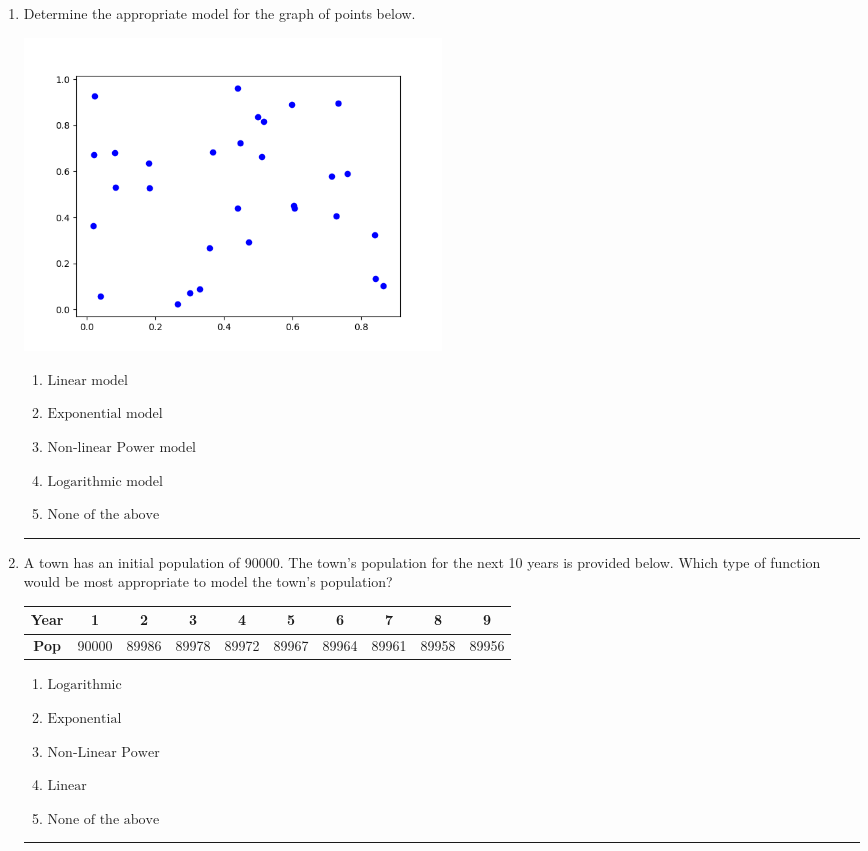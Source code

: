 \documentclass[14pt]{extbook}
\newcommand{\litem}[1]{\item#1\hspace*{-1cm}\rule{\textwidth}{0.4pt}}
\begin{document}
\begin{enumerate}
{\begin{enumerate}[label=\Alph*.]
\end{enumerate} }
\litem{
Determine the appropriate model for the graph of points below.
\begin{center}
    \includegraphics[width=0.5\textwidth]{../Figures/identifyModelGraph11CopyB.png}
\end{center}
\begin{enumerate}[label=\Alph*.]
\item \( \text{Linear model} \)
\item \( \text{Exponential model} \)
\item \( \text{Non-linear Power model} \)
\item \( \text{Logarithmic model} \)
\item \( \text{None of the above} \)

\end{enumerate} }
\litem{
A town has an initial population of 90000. The town's population for the next 10 years is provided below. Which type of function would be most appropriate to model the town's population?

\begin{tabular}{c|c|c|c|c|c|c|c|c|c}
\textbf{Year} &1 &2 &3 &4 &5 &6 &7 &8 &9\tabularnewline \hline
\textbf{Pop} &90000 &89986 &89978 &89972 &89967 &89964 &89961 &89958 &89956\end{tabular}\begin{enumerate}[label=\Alph*.]
\item \( \text{Logarithmic} \)
\item \( \text{Exponential} \)
\item \( \text{Non-Linear Power} \)
\item \( \text{Linear} \)
\item \( \text{None of the above} \)


\end{enumerate}}
\end{enumerate}
\end{document}
